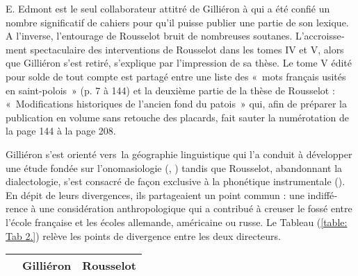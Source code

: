 \documentclass[french,output=paper,colorlinks,citecolor=brown]{../langscibook}
\begin{document}
\begin{otherlanguage}{french}
E. Edmont est le seul collaborateur attitré de Gilliéron à qui a été confié un nombre significatif de cahiers pour qu’il puisse publier une partie de son lexique. A l’inverse, l’entourage de Rousselot bruit de nombreuses soutanes. L’accroissement spectaculaire des interventions de Rousselot dans les tomes IV et V, alors que Gilliéron s’est retiré, s’explique par l’impression de sa thèse. Le tome V édité pour solde de tout compte est partagé entre une liste des «~mots français usités en saint-polois~» (p. 7 à 144) et la deuxième partie de la thèse de Rousselot : «~Modifications historiques de l’ancien fond du patois~» qui, afin de préparer la publication en volume sans retouche des placards, fait sauter la numérotation de la page 144 à la page 208.

Gilliéron s’est orienté vers~la géographie linguistique qui l’a conduit à développer une étude fondée sur l’onomasiologie (\citeyear{GilliéronMongin1905}, \citeyear{Gilliéron1918}) tandis que Rousselot, abandonnant la dialectologie, s’est consacré de façon exclusive à la phonétique instrumentale (\citeyear{Rousselot1897}). En dépit de leurs divergences, ils partageaient un point commun : une indifférence à une considération anthropologique qui a contribué à creuser le fossé entre l’école française et les écoles allemande, américaine ou russe. Le Tableau (\ref{table: Tab 2.}) relève les points de divergence entre les deux directeurs.

\begin{table}    
\begin{tabularx}{\textwidth}{lQQ}
\lsptoprule
& Gilliéron        &       Rousselot \\\midrule


\end{tabularx}
\end{table}
\end{otherlanguage}
\end{document}
